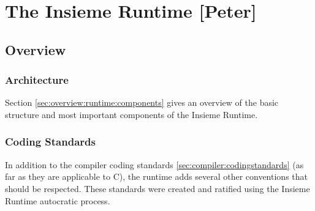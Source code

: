 \chapter{The Insieme Runtime [Peter]} \label{cap:runtime}

\section{Overview}
\subsection{Architecture}
Section \ref{sec:overview:runtime:components} gives an overview of the basic structure and most important components of the Insieme Runtime.

\subsection{Coding Standards}
In addition to the compiler coding standards \ref{sec:compiler:codingstandards} (as far as they are applicable to C), the runtime adds several other conventions that should be respected. These standards were created and ratified using the Insieme Runtime autocratic process.

